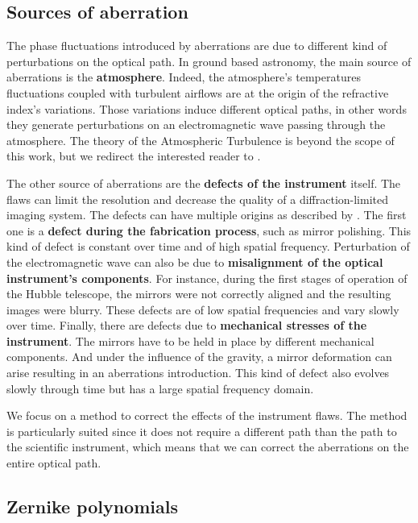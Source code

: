 \subsection{Sources of aberration}
\label{subsec:SourcesAb}

The phase fluctuations introduced by aberrations are due to different kind of perturbations on the optical path. In ground based astronomy, the main source of aberrations is the \textbf{atmosphere}. Indeed, the atmosphere's temperatures fluctuations coupled with turbulent airflows are at the origin of the refractive index's variations. Those variations induce different optical paths, in other words they generate perturbations on an electromagnetic wave passing through the atmosphere. The theory of the Atmospheric Turbulence is beyond the scope of this work, but we redirect the interested reader to \citet{obukhov1949,Tatarski1961,kolmogorov1968}.

The other source of aberrations are the \textbf{defects of the instrument} itself. The flaws can limit the resolution and decrease the quality of a diffraction-limited imaging system. The defects can have multiple origins as described by \citet{Blanc2002}. The first one is a \textbf{defect during the fabrication process}, such as mirror polishing. This kind of defect is constant over time and of high spatial frequency. Perturbation of the electromagnetic wave can also be due to \textbf{misalignment of the optical instrument's components}. For instance, during the first stages of operation of the Hubble telescope, the mirrors were not correctly aligned and the resulting images were blurry. These defects are of low spatial frequencies and vary slowly over time. Finally, there are defects due to \textbf{mechanical stresses of the instrument}. The mirrors have to be held in place by different mechanical components. And under the influence of the gravity, a mirror deformation can arise resulting in an aberrations introduction. This kind of defect also evolves slowly through time but has a large spatial frequency domain.

We focus on a method to correct the effects of the instrument flaws. The method is particularly suited since it does not require a different path than the path to the scientific instrument, which means that we can correct the aberrations on the entire optical path.

\subsection{Zernike polynomials}
\label{subsec:ZernikePol}


